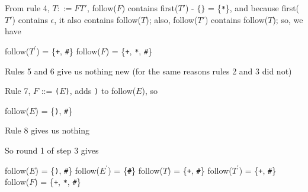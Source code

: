 \documentclass[8pt,a4paper,compress]{beamer}
\newcommand{\mm}[1]{$#1$}
\newcommand{\expo}[2]{$#1^{#2}$}
\newenvironment{spaced}
{
\smallskip
\hspace{.5cm}
\begin{minipage}[c]{\textwidth}
}
{
\end{minipage}
\smallskip
}
\begin{document}
\begin{frame}[fragile]
\pause

From rule 4, $T  ::= F T'$, follow($F$) contains first($T'$) - $\{\}$ = \{\lstinline{*}\}, and because first($T'$) contains $\epsilon$, it also contains follow($T$); also, follow($T'$) contains follow($T$); so, we have

\text{ }
\begin{spaced}
\begin{production}
follow(\expo{T}{\prime}) = \{\lstinline{+}, \lstinline{#}\}
follow(\mm{F})  = \{\lstinline{+}, \lstinline{*}, \lstinline{#}\}
\end{production}
\end{spaced}

\pause

Rules 5 and 6 give us nothing new (for the same reasons rules 2 and 3 did not)

\pause
\bigskip

Rule 7, $F$  ::= \lstinline{(}$E$\lstinline{)}, adds \lstinline{)} to follow($E$), so

\text{ }
\begin{spaced}
\begin{production}
follow(\mm{E}) = \{\lstinline{)}, \lstinline{#}\}
\end{production}
\end{spaced}

\pause

Rule 8 gives us nothing

\pause
\bigskip

So round 1 of step 3 gives

\text{ }
\begin{spaced}
\begin{production}
follow(\mm{E})  = \{\lstinline{)}, \lstinline{#}\}
follow(\expo{E}{\prime}) = \{\lstinline{#}\}
follow(\mm{T})  = \{\lstinline{+}, \lstinline{#}\}
follow(\expo{T}{\prime}) = \{\lstinline{+}, \lstinline{#}\}
follow(\mm{F})  = \{\lstinline{+}, \lstinline{*}, \lstinline{#}\}
\end{production}
\end{spaced}
\end{frame}
\end{document}
